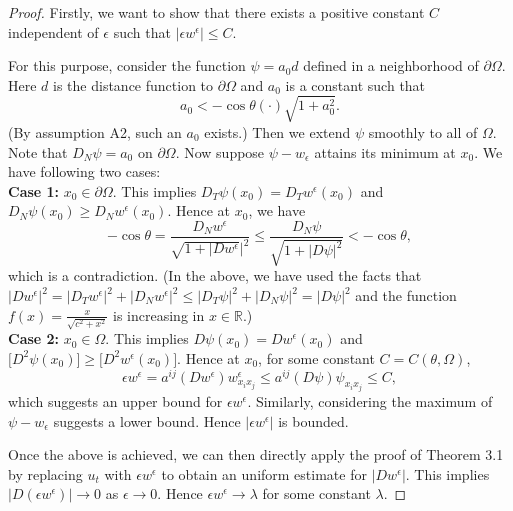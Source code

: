 \documentclass[12pt]{article}
\numberwithin{equation}{section}
\theoremstyle{plain}
\theoremstyle{definition}
\theoremstyle{remark}
\begin{document}
\begin{proof}
Firstly, we want to show that there exists a positive constant $C$ independent of $\epsilon$ such that $|\epsilon w^{\epsilon}|\leq C$. 

For this purpose, consider the function $\psi=a_0 d$ defined in a neighborhood of $\partial\Omega$.
Here $d$ is the distance function to $\partial\Omega$ and $a_0$ is a constant such that 
\begin{equation*}
    a_0 < -\cos{\theta(\cdot)} \sqrt{1+a_0^2}.
\end{equation*}
(By assumption A2, such an $a_0$ exists.)
Then we extend $\psi$ smoothly to all of $\Omega$. Note that
$D_N\psi = a_0$ on $\partial\Omega$. Now suppose $\psi-w_{\epsilon}$ attains its minimum at $x_0$. We have following two cases: \\
\textbf{Case 1:} $x_0 \in \partial\Omega$. This implies $D_T \psi(x_0) = D_T w^{\epsilon}(x_0)$ and $D_N \psi(x_0) \geq D_N w^{\epsilon}(x_0)$. Hence at $x_0$, we have
\begin{equation*}
      -\cos{\theta} = \frac{D_N w^{\epsilon}}{\sqrt{1+|D w^{\epsilon}}|^2} \leq \frac{D_N \psi}{\sqrt{1+|D \psi|^2}} < -\cos{\theta},
\end{equation*}
which is a contradiction. (In the above, we have used the facts that 
$|Dw^\epsilon|^2 = |D_Tw^\epsilon|^2 + |D_Nw^\epsilon|^2
\leq
|D_T\psi|^2 + |D_N\psi|^2
=|D\psi|^2
$ and the function $f(x) = \frac{x}{\sqrt{c^2+x^2}}$ is increasing 
in $x\in\mathbb{R}$.)\\
\textbf{Case 2:} $x_0 \in \Omega$. This implies $D\psi(x_0) = D w^{\epsilon}(x_0)$ and $\big[ D^2 \psi(x_0) \big] \geq \big[ D^2 w^{\epsilon}(x_0) \big]$. Hence at $x_0$, for some constant $C=C(\theta, \Omega)$,
\begin{equation*}
    \epsilon w^{\epsilon} = a^{ij} (D w^{\epsilon}) w_{x_i x_j}^{\epsilon} \leq a^{ij} (D \psi) \psi_{x_i x_j} \leq C,
\end{equation*}
which suggests an upper bound for $\epsilon w^{\epsilon}$. Similarly, considering the maximum of $\psi-w_{\epsilon}$ suggests a lower bound. Hence $|\epsilon w^{\epsilon}|$ is bounded.

Once the above is achieved, we can then directly apply the proof of Theorem 3.1 by replacing $u_t$ with $\epsilon w^{\epsilon}$ to obtain an uniform estimate for $|Dw^{\epsilon}|$.
This implies $| D (\epsilon w^{\epsilon})| \rightarrow 0$ as $\epsilon \rightarrow 0$. Hence $\epsilon w^{\epsilon} \rightarrow \lambda$ for some constant $\lambda$.


\end{proof}
\end{document}
